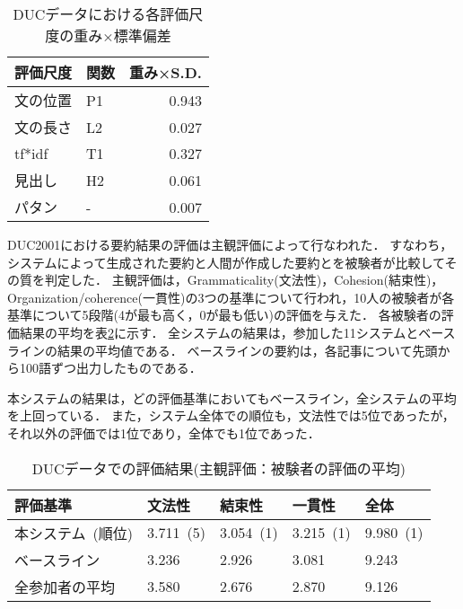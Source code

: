 \begin{table}[t]
\caption{DUCデータにおける各評価尺度の重み×標準偏差}
\label{table:optimal_weight_duc}
\begin{center}
\begin{tabular}{l|l|r} \hline
評価尺度 & 関数 & 重み×S.D. \\ \hline
文の位置 & P1   & 0.943 \\
文の長さ & L2   & 0.027 \\
tf*idf   & T1   & 0.327 \\
見出し   & H2   & 0.061 \\
パタン   & -    & 0.007 \\ \hline
\end{tabular}
\end{center}
\end{table}

DUC2001における要約結果の評価は主観評価によって行なわれた．
すなわち，システムによって生成された要約と人間が作成した要約とを被験者が比較してその質を判定した．
主観評価は，Grammaticality(文法性)，Cohesion(結束性)，Organization/coherence(一貫性)の3つの基準について行われ，10人の被験者が各基準について5段階(4が最も高く，0が最も低い)の評価を与えた．
各被験者の評価結果の平均を表\ref{table:eval_result}に示す．
全システムの結果は，参加した11システムとベースラインの結果の平均値である．
ベースラインの要約は，各記事について先頭から100語ずつ出力したものである．

本システムの結果は，どの評価基準においてもベースライン，全システムの平均を上回っている．
また，システム全体での順位も，文法性では5位であったが，それ以外の評価では1位であり，全体でも1位であった．

\begin{table}[t]
\caption{DUCデータでの評価結果(主観評価：被験者の評価の平均)}
\label{table:eval_result}
\begin{center}
\begin{tabular}{l|lll|l} \hline
評価基準          & 文法性    & 結束性    & 一貫性    & 全体      \\ \hline
本システム~(順位) & 3.711~(5) & 3.054~(1) & 3.215~(1) & 9.980~(1) \\       
ベースライン      & 3.236     & 2.926     & 3.081     & 9.243     \\       
全参加者の平均    & 3.580     & 2.676     & 2.870     & 9.126     \\ \hline
\end{tabular}
\end{center}
\end{table}


